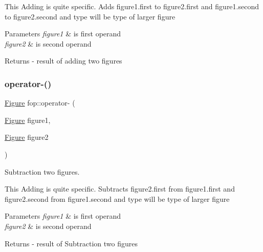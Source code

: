 This Adding is quite specific. Adds \textquotesingle{}figure1.\+first\textquotesingle{} to \textquotesingle{}figure2.\+first\textquotesingle{} and \textquotesingle{}figure1.\+second\textquotesingle{} to \textquotesingle{}figure2.\+second\textquotesingle{} and type will be \textquotesingle{}type\textquotesingle{} of larger figure 
\begin{DoxyParams}{Parameters}
{\em figure1} & is first operand \\
\hline
{\em figure2} & is second operand \\
\hline
\end{DoxyParams}
\begin{DoxyReturn}{Returns}
-\/ result of adding two figures 
\end{DoxyReturn}
\mbox{\label{namespacefop_ab4ccc3243195b647632a36db88113230}} 
\subsubsection{\texorpdfstring{operator-\/()}{operator-()}}
{\footnotesize\ttfamily \mbox{\hyperlink{classfop_1_1_figure}{Figure}} fop\+::operator-\/ (\begin{DoxyParamCaption}\item[{\mbox{\hyperlink{classfop_1_1_figure}{Figure}}}]{figure1,  }\item[{\mbox{\hyperlink{classfop_1_1_figure}{Figure}}}]{figure2 }\end{DoxyParamCaption})}



Subtraction two figures. 

This Adding is quite specific. Subtracts \textquotesingle{}figure2.\+first\textquotesingle{} from \textquotesingle{}figure1.\+first\textquotesingle{} and \textquotesingle{}figure2.\+second\textquotesingle{} from \textquotesingle{}figure1.\+second\textquotesingle{} and type will be \textquotesingle{}type\textquotesingle{} of larger figure 
\begin{DoxyParams}{Parameters}
{\em figure1} & is first operand \\
\hline
{\em figure2} & is second operand \\
\hline
\end{DoxyParams}
\begin{DoxyReturn}{Returns}
-\/ result of Subtraction two figures 
\end{DoxyReturn}
\mbox{\label{namespacefop_a848b460556a75362850867d9b567ae59}} 
